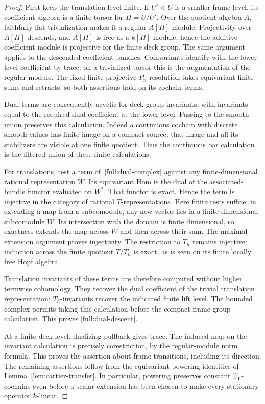\begin{proof}
First keep the translation level finite.  If $U'\triangleleft U$ is a
smaller frame level, its coefficient algebra is a finite torsor for
$H=U/U'$.  Over the quotient algebra $A$, faithfully flat
trivialization makes it a regular $A[H]$-module.  Projectivity over
$A[H]$ descends, and $A[H]$ is free as a $k[H]$-module; hence the
additive coefficient module is projective for the finite deck group.
The same argument applies to the descended coefficient bundles.
Coinvariants identify with the lower-level coefficient by trace: on a
trivialized torsor this is the augmentation of the regular module.
The fixed finite projective $P_n$-resolution takes equivariant finite
sums and retracts, so both assertions hold on its cochain terms.

Dual terms are consequently acyclic for deck-group invariants, with
invariants equal to the required dual coefficient at the lower level.
Passing to the smooth union preserves this calculation.  Indeed a
continuous cochain with discrete smooth values has finite image on a
compact source; that image and all its stabilizers are visible at one
finite quotient.  Thus the continuous bar calculation is the filtered
union of these finite calculations.

For translations, test a term of~\eqref{full:dual-complex} against any
finite-dimensional rational representation $W$.  Its equivariant Hom
is the dual of the associated-bundle functor evaluated on $W^*$.
That functor is exact.  Hence the term is injective in the category of
rational $T$-representations.  Here finite tests suffice: in extending
a map from a subcomodule, any new vector lies in a finite-dimensional
subcomodule $W$.  Its intersection with the domain is finite
dimensional, so exactness extends the map across $W$ and then across
their sum.  The maximal-extension argument proves injectivity.  The
restriction to $T_h$ remains injective: induction across the finite
quotient $T/T_h$ is exact, as is seen on its finite locally free Hopf
algebra.

Translation invariants of these terms are therefore computed without
higher termwise cohomology.  They recover the dual coefficient of the
trivial translation representation; $T_h$-invariants recover the
indicated finite lift level.  The bounded complex permits taking this
calculation before the compact frame-group calculation.  This proves
\eqref{full:dual-descent}.

At a finite deck level, dualizing pullback gives trace.  The induced map
on the invariant calculation is precisely corestriction, by the
regular-module norm formula.  This proves the assertion about frame
transitions, including its direction.  The remaining assertions follow
from the equivariant powering identities of
Lemma~\ref{lem:cartier-transfer}.  In particular, powering preserves
constant $\mathbb F_p$-cochains even before a scalar extension has been chosen
to make every stationary operator $k$-linear.
\end{proof}

